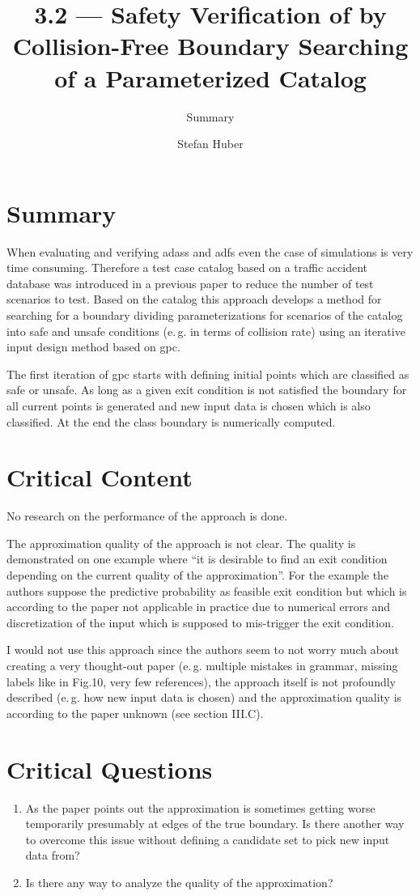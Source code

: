 \documentclass[oneside, notitlepage, twocolumn]{scrartcl}
\title{\LARGE 3.2 --- Safety Verification of \glsname{adas} by Collision-Free Boundary Searching of a Parameterized Catalog}
\subtitle{Summary}
\author{Stefan Huber}
\newcommand{\eg}{e.\,g.\xspace}
\begin{document}
\maketitle

\section{Summary}
When evaluating and verifying \glspl{adas} and \glspl{adf} even the case of simulations is very time consuming.
Therefore a test case catalog based on a traffic accident database was introduced in a previous paper to reduce the number of test scenarios to test.
Based on the catalog this approach develops a method for searching for a boundary dividing parameterizations for scenarios of the catalog into safe and unsafe conditions (\eg{} in terms of collision rate) using an iterative input design method based on \gls{gpc}.\par
The first iteration of \gls{gpc} starts with defining initial points which are classified as safe or unsafe.
As long as a given exit condition is not satisfied the boundary for all current points is generated and new input data is chosen which is also classified.
At the end the class boundary is numerically computed.

\section{Critical Content}
No research on the performance of the approach is done.\par
The approximation quality of the approach is not clear.
The quality is demonstrated on one example where ``it is desirable to find an exit condition depending on the current quality of the approximation''.
For the example the authors suppose the predictive probability as feasible exit condition but which is according to the paper not applicable in practice due to numerical errors and discretization of the input which is supposed to mis-trigger the exit condition.\par
I would not use this approach since the authors seem to not worry much about creating a very thought-out paper (\eg{} multiple mistakes in grammar, missing labels like in Fig.10, very few references), the approach itself is not profoundly described (\eg{} how new input data is chosen) and the approximation quality is according to the paper unknown (see section III.C).

\section{Critical Questions}
\begin{enumerate}
    \item As the paper points out the approximation is sometimes getting worse temporarily presumably at edges of the true boundary.
        Is there another way to overcome this issue without defining a candidate set to pick new input data from?
    \item Is there any way to analyze the quality of the approximation?
\end{enumerate}
\end{document}
